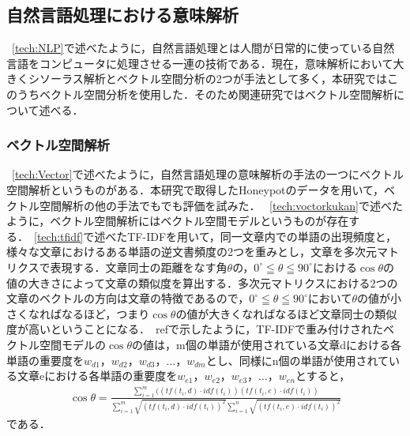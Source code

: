 \subsection{自然言語処理における意味解析}
~\ref{tech:NLP}で述べたように，自然言語処理とは人間が日常的に使っている自然言語をコンピュータに処理させる一連の技術である．現在，意味解析において大きくシソーラス解析とベクトル空間分析の2つが手法として多く，本研究ではこのうちベクトル空間分析を使用した．そのため関連研究ではベクトル空間解析について述べる．
\subsubsection{ベクトル空間解析}
~\ref{tech:Vector}で述べたように，自然言語処理の意味解析の手法の一つにベクトル空間解析というものがある．本研究で取得したHoneypotのデータを用いて，ベクトル空間解析の他の手法でもでも評価を試みた．
~\ref{tech:voctorkukan}で述べたように，ベクトル空間解析にはベクトル空間モデルというものが存在する．~\ref{tech:tfidf}で述べたTF-IDFを用いて，同一文章内での単語の出現頻度と，様々な文章におけるある単語の逆文書頻度の2つを重みとし，文章を多次元マトリクスで表現する．文章同士の距離をなす角$ \theta $の，$ 0^\circ \leqq \theta \leqq 90^\circ $における$ \cos \theta $の値の大きさによって文章の類似度を算出する．多次元マトリクスにおける2つの文章のベクトルの方向は文章の特徴であるので，$ 0^\circ \leqq \theta \leqq 90^\circ $において$ \theta $の値が小さくなればなるほど，つまり$ \cos \theta $の値が大きくなればなるほど文章同士の類似度が高いということになる．~ref{}で示したように，TF-IDFで重み付けされたベクトル空間モデルの$ \cos \theta $の値は，m個の単語が使用されている文章dにおける各単語の重要度を$ w_{d1}，w_{d2}，w_{d3}， \ldots ，w_{dm} $とし、同様にn個の単語が使用されている文章eにおける各単語の重要度を$ w_{e1}，w_{e2}，w_{e3}， \ldots ，w_{en} $とすると，\\
\begin{align}
\cos \theta = \frac{ \sum_{i=1}^{m} ((tf(t_{i},d) \cdot idf(t_{i}))(tf(t_{i},e) \cdot idf(t_{i}))}{\sum_{i=1}^{m} \sqrt{(tf(t_{i},d) \cdot idf(t_{i}))^2} \sum_{i=1}^{n} \sqrt{(tf(t_{i},e) \cdot idf(t_{i}))^2}} \nonumber
\end{align}
である．


